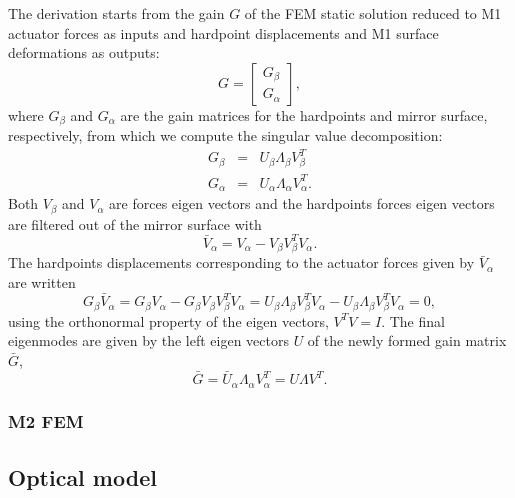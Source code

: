\documentclass{gmto}
\begin{document}
The derivation starts from the gain $G$ of the FEM static solution reduced to M1
actuator forces as inputs and hardpoint displacements and M1 surface
deformations as outputs:
\begin{equation}
  \label{eq:9}
  G = \begin{bmatrix}
    G_\beta \\ G_\alpha
  \end{bmatrix},
\end{equation}
where $G_\beta$ and $G_\alpha$ are the gain matrices for the hardpoints and
mirror surface, respectively, from which we compute the singular value
decomposition:
\begin{eqnarray}
  \label{eq:10}
  G_\beta &=& U_\beta\Lambda_\beta V_\beta^T \\
  G_\alpha &=& U_\alpha\Lambda_\alpha V_\alpha^T .
\end{eqnarray}
Both $V_\beta$ and $V_\alpha$ are forces eigen vectors and the hardpoints forces
eigen vectors are filtered out of the mirror surface with
\begin{equation}
  \label{eq:11}
  \bar V_\alpha = V_\alpha - V_\beta V_\beta^T  V_\alpha.
\end{equation}
The hardpoints displacements corresponding to the actuator forces given by $\bar
V_\alpha$ are written
\begin{equation}
  \label{eq:12}
  G_\beta \bar V_\alpha = G_\beta  V_\alpha - G_\beta V_\beta V_\beta^T  V_\alpha = U_\beta\Lambda_\beta V_\beta^T V_\alpha - U_\beta\Lambda_\beta V_\beta^T V_\alpha =0,
\end{equation}
using the orthonormal property of the eigen vectors, $V^TV=I$.
The final eigenmodes are given by the left eigen vectors $U$ of the newly
formed gain matrix $\bar G$,
\begin{equation}
  \label{eq:13}
  \bar G = \bar U_\alpha\Lambda_\alpha V_\alpha^T = U\Lambda V^T.
\end{equation}

\subsubsection{M2 FEM}
\label{sec:m2-fem}


\clearpage
\subsection{Optical model}
\label{sec:optics}

\cite{GMTO.OpticalDesign}
\end{document}

